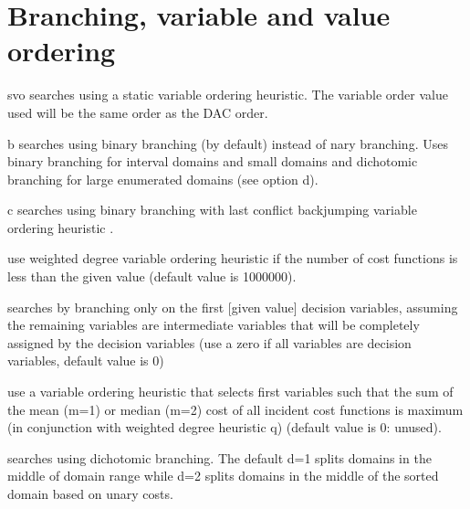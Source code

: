 \documentclass[letterpaper,10pt,openany,oneside,english]{sphinxmanual}
\begin{document}
\section{Branching, variable and value ordering}
\label{\detokenize{userdoc:branching-variable-and-value-ordering}}\begin{optionlist}{3cm}
\item [\sphinxhyphen{}svo]  
\sphinxAtStartPar
searches using a static variable ordering heuristic.
The variable order value used will be the same order as the DAC order.
\item [\sphinxhyphen{}b]  
\sphinxAtStartPar
searches using binary branching (by default) instead of n\sphinxhyphen{}ary branching.
Uses binary branching for interval domains and small domains
and dichotomic branching for large enumerated domains (see option \sphinxhyphen{}d).
\item [\sphinxhyphen{}c]  
\sphinxAtStartPar
searches using binary branching with last conflict
backjumping variable ordering heuristic .
\end{optionlist}
\begin{description}
\sphinxAtStartPar
use weighted degree variable ordering heuristic 
if the number of cost
functions is less than the given value (default value is 1000000).

\sphinxAtStartPar
searches by branching only on the first {[}given value{]}
decision variables, assuming the remaining variables are
intermediate variables that will be completely assigned by the
decision variables (use a zero if all variables are decision
variables, default value is 0)

\sphinxAtStartPar
use a variable ordering heuristic that selects first variables such
that the sum of the mean (m=1) or median (m=2) cost of all incident
cost functions is maximum 
(in conjunction with weighted degree
heuristic \sphinxhyphen{}q) (default value is 0: unused).

\sphinxAtStartPar
searches using dichotomic branching. The default d=1 splits domains
in the middle of domain range while d=2 splits domains in the middle
of the sorted domain based on unary costs.

\end{description}
\end{document}
